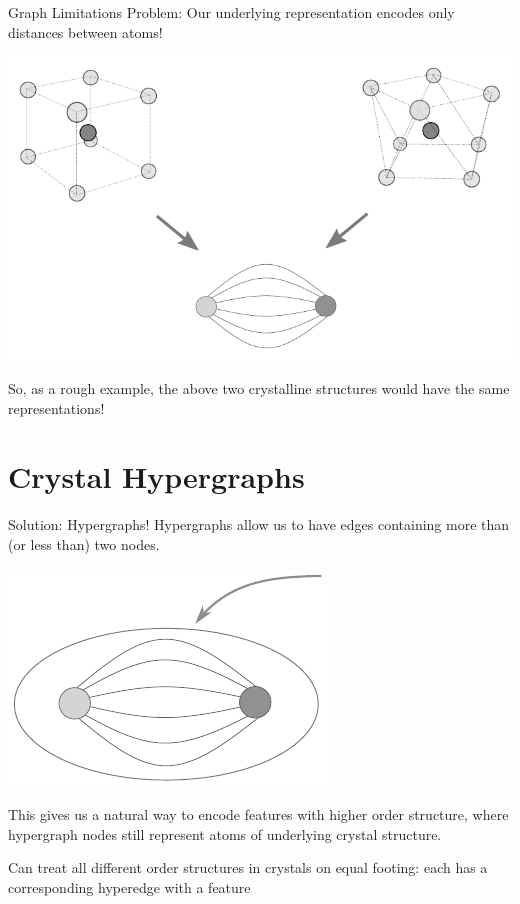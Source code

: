 \documentclass[11pt]{beamer}
\begin{document}
\begin{frame}{Graph Limitations}
Problem: Our underlying representation encodes only distances between atoms!

\begin{center}

\includegraphics[scale=0.7]{crystalgraph_cntex.pdf}

\end{center}

So, as a rough example, the above two crystalline structures would have the same representations!
\end{frame} 

\section{Crystal Hypergraphs}
\begin{frame}{Solution: Hypergraphs!}
Hypergraphs allow us to have edges containing more than (or less than) two nodes.

\begin{center}
\includegraphics[scale=0.7]{hyperedge_ex.pdf}
\end{center}

This gives us a natural way to encode features with higher order structure, where hypergraph nodes still represent atoms of underlying crystal structure.

\vspace{.5cm}

Can treat all different order structures in crystals on equal footing: each has a corresponding hyperedge with a feature
\end{frame}
\end{document}
